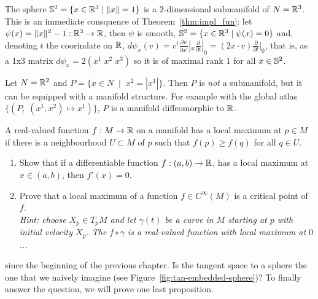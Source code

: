 \begin{example}\label{ex:s2}
  The sphere $\mathbb{S}^2 = \{x\in\mathbb{R}^3 \mid \|x\| = 1\}$ is a $2$-dimensional submanifold of $N=\mathbb{R}^3$.
  This is an immediate consquence of Theorem~\ref{thm:impl_fun}: let $\psi(x) = \|x\|^2 -1 : \mathbb{R}^3 \to \mathbb{R}$, then $\psi$ is smooth, $\mathbb{S}^2 = \{x\in\mathbb{R}^3\mid\psi(x)=0\}$ and, denoting $t$ the coorindate on $\mathbb{R}$, $d\psi_x(v)= v^i \frac{\partial \psi}{\partial x^i}|_x \frac{\partial}{\partial t}|_0 = (2x\cdot v) \frac{\partial}{\partial t}|_0$, that is, as a 1x3 matrix $d\psi_x = 2(x^1\; x^2\; x^3)$ so it is of maximal rank $1$ for all $x\in\mathbb{S}^2$.
\end{example}

\begin{example}
  Let $N = \mathbb{R}^2$ and $P = \{ x\in N \;\mid\; x^2 = |x^1| \}$.
  Then $P$ is \emph{not} a submanifold, but it can be equipped with a manifold structure.
  For example with the global atlas $\{(P,\; (x^1,x^2)\mapsto x^1)\}$, $P$ is a manifold diffeomorphic to $\mathbb{R}$.
\end{example}

\begin{exercise}
  A real-valued function $f:M\to\mathbb{R}$ on a manifold has a local maximum at $p\in M$ if there is a neighbourhood $U\subset M$ of $p$ such that $f(p) \geq f(q)$ for all $q\in U$.
  \begin{enumerate}
    \item Show that if a differentiable function $f:(a,b)\to\mathbb{R}$, has a local maximum at $x\in (a,b)$, then $f'(x) = 0$.
    \item Prove that a local maximum of a function $f\in C^\infty(M)$ is a critical point of $f$.\\
          \textit{\small Hint: choose $X_p\in T_pM$ and let $\gamma(t)$ be a curve in $M$ starting at $p$ with initial velocity $X_p$. The $f\circ \gamma$ is a real-valued function with local maximum at $0$...}
  \end{enumerate}
\end{exercise}

 since the beginning of the previous chapter.
Is the tangent space to a sphere the one that we naively imagine (see Figure~\ref{fig:tan-embedded-sphere})?
To finally answer the question, we will prove one last proposition.

